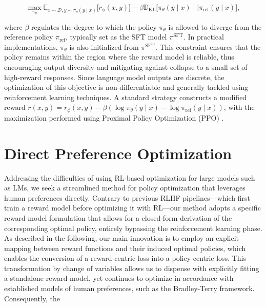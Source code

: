 \begin{equation}\label{eq:RL}
\max_{\pi_{\theta}}  \mathbb{E}_{x\sim \mathcal{D}, y\sim \pi_{\theta}(y \mid x)}\bigl[r_{\phi}(x, y)\bigr] - \beta\mathbb{D}_{\textrm{KL}}\bigl[\pi_{\theta}(y\mid x)\mid \mid \pi_\text{ref}(y\mid x)\bigr],
\end{equation}

where $\beta$ regulates the degree to which the policy $\pi_\theta$ is allowed to diverge from the reference policy $\pi_\text{ref}$, typically set as the SFT model $\pi^\text{SFT}$. In practical implementations, $\pi_\theta$ is also initialized from $\pi^\text{SFT}$. This constraint ensures that the policy remains within the region where the reward model is reliable, thus encouraging output diversity and mitigating against collapse to a small set of high-reward responses. Since language model outputs are discrete, the optimization of this objective is non-differentiable and generally tackled using reinforcement learning techniques. A standard strategy \citep{ziegler2020finetuning, stiennon2022learning, bai2022training, ouyang2022training} constructs a modified reward ${r(x, y) = r_{\phi}(x, y) -\beta (\log \pi_{\theta}(y\mid x) - \log \pi_\text{ref}(y\mid x))}$, with the maximization performed using Proximal Policy Optimization (PPO) \cite{schulman2017proximal}.

\section{Direct Preference Optimization}\label{sec:DPO}

Addressing the difficulties of using RL-based optimization for large models such as LMs, we seek a streamlined method for policy optimization that leverages human preferences directly. Contrary to previous RLHF pipelines—which first train a reward model before optimizing it with RL—our method adopts a specific reward model formulation that allows for a closed-form derivation of the corresponding optimal policy, entirely bypassing the reinforcement learning phase. As described in the following, our main innovation is to employ an explicit mapping between reward functions and their induced optimal policies, which enables the conversion of a reward-centric loss into a policy-centric loss. This transformation by change of variables allows us to dispense with explicitly fitting a standalone reward model, yet continues to optimize in accordance with established models of human preferences, such as the Bradley-Terry framework. Consequently, the

